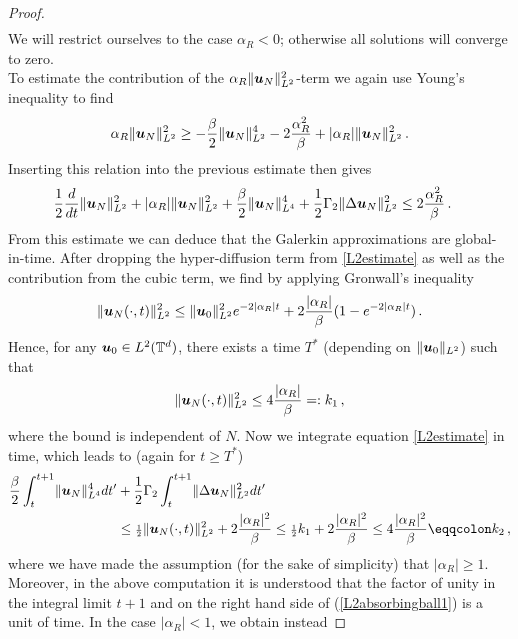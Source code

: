\documentclass[11pt]{amsart}
\newcommand{\bu}{\mbox{\boldmath$u$}}
\newcommand{\Rb}{\beta}
\newcommand{\Gamtwo}{\Gamma_{2}}
\newcommand\shalf{\ensuremath{{\scriptstyle\frac{1}{2}}}}
\theoremstyle{definition}
\numberwithin{equation}{section}
\numberwithin{equation}{section}
\begin{document}
\begin{proof}
\begin{align*}
\end{align*}
We will restrict ourselves to the case $\alpha_{R} < 0$; otherwise all solutions will converge to zero.\\
To estimate the contribution of the $\alpha_{R}\lVert \bu_N \rVert_{L^2}^2$-term we again use Young's inequality to find
\begin{equation}
\alpha_{R}\lVert \bu_N \rVert_{L^2}^2 \geq - \frac{\Rb}{2}\lVert \bu_N \rVert_{L^2}^{4} - 2 \frac{\alpha_R^2}{\Rb} + \lvert \alpha_{R}\rvert \lVert \bu_N \rVert_{L^2}^{2}\,.
\end{equation}
Inserting this relation into the previous estimate then gives
\begin{align}\label{L2estimate}
&\frac{1}{2} \frac{d}{d t} \lVert \bu_N \rVert_{L^2}^2 + \lvert \alpha_{R}\rvert \lVert \bu_N \rVert_{L^2}^{2} + \frac{\Rb}{2} \lVert \bu_N \rVert_{L^4}^4 + \frac{1}{2} \Gamtwo \lVert \Delta \bu_N \rVert_{L^2}^2 \leq 2 \frac{\alpha_{R}^2}{\Rb}\,.
\end{align}
From this estimate we can deduce that the Galerkin approximations are global-in-time. After dropping the hyper-diffusion term from \eqref{L2estimate} as well as the contribution from the cubic term, we find by applying Gronwall's inequality
\begin{equation}
\lVert \bu_N (\cdot, t) \rVert_{L^2}^2 \leq \lVert \bu_0 \rVert_{L^2}^2 e^{-2|\alpha_{R}|t} +
2 \frac{|\alpha_{R}|}{\Rb}(1 - e^{-2|\alpha_{R}|t})\,.
\end{equation}
Hence, for any $\bu_0 \in L^2 (\mathbb{T}^d)$, there exists a time $T^*$ (depending on $\lVert \bu_0 \rVert_{L^2}$) such that
\begin{equation} \label{absorbingballL2}
\lVert \bu_N (\cdot, t) \rVert_{L^2}^2 \leq 4 \frac{|\alpha_{R}|}{\Rb} =: k_{1}\,,
\end{equation}
where the bound is independent of $N$. Now we integrate equation \eqref{L2estimate} in time, which leads to (again for $t \geq T^*$)
\begin{align} 
\frac{\Rb}{2} \int_t^{t+1} \lVert \bu_N \rVert_{L^4}^4 dt' &+ \frac{1}{2} \Gamtwo \int_t^{t+1} \lVert \Delta \bu_N \rVert_{L^2}^2 dt' \nonumber \\
&\leq \shalf \lVert \bu_N (\cdot, t) \rVert_{L^2}^2 + 2 \frac{\lvert \alpha_{R} \rvert^2}{\Rb} \leq \shalf k_1 + 2
\frac{\lvert \alpha_{R} \rvert^2}{\Rb} \leq 4
\frac{\lvert \alpha_{R} \rvert^2}{\Rb} \eqqcolon k_{2}\,, \label{L2absorbingball1}
\end{align}
where we have made the assumption (for the sake of simplicity) that $\lvert \alpha_R \rvert \geq 1$. Moreover, in the above computation it is understood that the factor of unity in the integral limit $t+1$ and on the right hand side of (\ref{L2absorbingball1}) is a unit of time. In the case $\lvert \alpha_R \rvert < 1$, we obtain instead

\end{proof}
\end{document}
